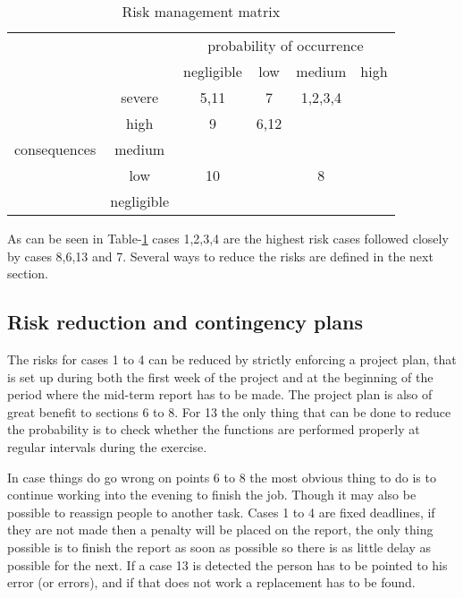 \begin{table}
	\centering
		\begin{tabular}{c|c||c|c|c|c|}
		\multicolumn{2}{c||}{} & \multicolumn{4}{|c|}{probability of occurrence} \\ \cline{3-6}
		\multicolumn{2}{c||}{} & negligible & low & medium & high \\ \hline \hline
		\multirow{5}{*}{consequences} & severe & 5,11 & 7 & 1,2,3,4 &  \\ \cline{2-6}
		 & high & 9 & 6,12 &  &  \\ \cline{2-6}
		 & medium & & & & \\ \cline{2-6}
		 & low & 10 & & 8 & \\ \cline{2-6}
		 & negligible & & & & \\
		\hline
	\end{tabular}
	\caption{Risk management matrix}
	\label{tab:Riskmanagementmatrix}
\end{table}

As can be seen in Table-\ref{tab:Riskmanagementmatrix} cases 1,2,3,4 are the highest risk cases followed closely by cases 8,6,13 and 7. Several ways to reduce the risks are defined in the next section.

\subsection{Risk reduction and contingency plans}
The risks for cases 1 to 4 can be reduced by strictly enforcing a project plan, that is set up during both the first week of the project and at the beginning of the period where the mid-term report has to be made. The project plan is also of great benefit to sections 6 to 8. For 13 the only thing that can be done to reduce the probability is to check whether the functions are performed properly at regular intervals during the exercise.

In case things do go wrong on points 6 to 8 the most obvious thing to do is to continue working into the evening to finish the job. Though it may also be possible to reassign people to another task. Cases 1 to 4 are fixed deadlines, if they are not made then a penalty will be placed on the report, the only thing possible is to finish the report as soon as possible so there is as little delay as possible for the next. If a case 13 is detected the person has to be pointed to his error (or errors), and if that does not work a replacement has to be found.